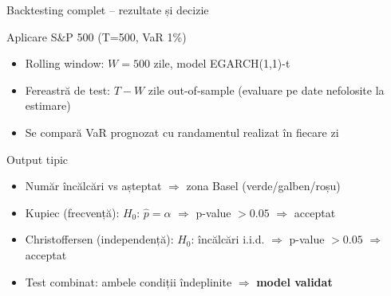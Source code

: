 \documentclass[9pt, aspectratio=169, t]{beamer}
\begin{document}
\begin{frame}{Backtesting complet -- rezultate și decizie}
    \small
    \begin{block}{Aplicare S\&P 500 (T=500, VaR 1\%)}
        \begin{itemize}
            \item Rolling window: $W = 500$ zile, model EGARCH(1,1)-t
            \item Fereastră de test: $T - W$ zile out-of-sample (evaluare pe date nefolosite la estimare)
            \item Se compară VaR prognozat cu randamentul realizat în fiecare zi
        \end{itemize}
    \end{block}
    \begin{exampleblock}{Output tipic}
        \begin{itemize}
            \item Număr încălcări vs așteptat $\Rightarrow$ zona Basel (verde/galben/roșu)
            \item Kupiec (frecvență): $H_0$: $\hat{p} = \alpha$ $\Rightarrow$ p-value $> 0.05$ $\Rightarrow$ acceptat
            \item Christoffersen (independență): $H_0$: încălcări i.i.d. $\Rightarrow$ p-value $> 0.05$ $\Rightarrow$ acceptat
            \item Test combinat: ambele condiții îndeplinite $\Rightarrow$ \textcolor{Forest}{\textbf{model validat}}
        \end{itemize}
    \end{exampleblock}
\end{frame}
\end{document}
